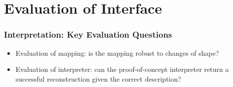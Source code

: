 \documentclass{beamer}
\begin{document}


\section{Evaluation of Interface}
\begin{frame}
\tableofcontents[currentsection,currentsubsection, 
    hideothersubsections, 
    sectionstyle=show/shaded,]
\end{frame}

\begin{frame}
\frametitle{Interpretation: Key Evaluation Questions}

\begin{itemize}
\item Evaluation of mapping: is the mapping robust to changes of shape?
\item Evaluation of interpreter: can the proof-of-concept interpreter return a successful reconstruction given the correct description?
\end{itemize}

\end{frame}
\end{document}

